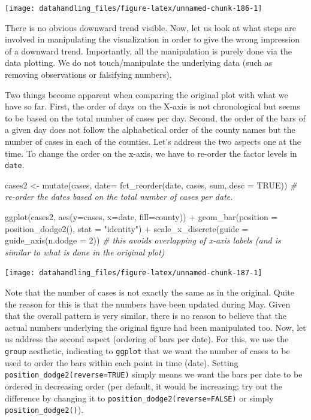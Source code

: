 \documentclass[
  12pt,
]{style/krantz}
\newenvironment{Shaded}{\begin{snugshade}}{\end{snugshade}}
\newcommand{\AttributeTok}[1]{\textcolor[rgb]{0.77,0.63,0.00}{#1}}
\newcommand{\CommentTok}[1]{\textcolor[rgb]{0.56,0.35,0.01}{\textit{#1}}}
\newcommand{\ConstantTok}[1]{\textcolor[rgb]{0.00,0.00,0.00}{#1}}
\newcommand{\DecValTok}[1]{\textcolor[rgb]{0.00,0.00,0.81}{#1}}
\newcommand{\FunctionTok}[1]{\textcolor[rgb]{0.00,0.00,0.00}{#1}}
\newcommand{\NormalTok}[1]{#1}
\newcommand{\OtherTok}[1]{\textcolor[rgb]{0.56,0.35,0.01}{#1}}
\newcommand{\SpecialCharTok}[1]{\textcolor[rgb]{0.00,0.00,0.00}{#1}}
\newcommand{\StringTok}[1]{\textcolor[rgb]{0.31,0.60,0.02}{#1}}
\begin{document}
\texttt{[image: datahandling\_files/figure-latex/unnamed-chunk-186-1]}

There is no obvious downward trend visible. Now, let us look at what steps are involved in manipulating the visualization in order to give the wrong impression of a downward trend. Importantly, all the manipulation is purely done via the data plotting. We do not touch/manipulate the underlying data (such as removing observations or falsifying numbers).

Two things become apparent when comparing the original plot with what we have so far. First, the order of days on the X-axis is not chronological but seems to be based on the total number of cases per day. Second, the order of the bars of a given day does not follow the alphabetical order of the county names but the number of cases in each of the counties. Let's address the two aspects one at the time. To change the order on the x-axis, we have to re-order the factor levels in \texttt{date}.

\begin{Shaded}
\begin{Highlighting}[]
\NormalTok{cases2 }\OtherTok{\textless{}{-}} \FunctionTok{mutate}\NormalTok{(cases, }\AttributeTok{date=} \FunctionTok{fct\_reorder}\NormalTok{(date, cases, sum,}\AttributeTok{.desc =} \ConstantTok{TRUE}\NormalTok{)) }\CommentTok{\# re{-}order the dates based on the total number of cases per date.}

\FunctionTok{ggplot}\NormalTok{(cases2, }\FunctionTok{aes}\NormalTok{(}\AttributeTok{y=}\NormalTok{cases, }\AttributeTok{x=}\NormalTok{date, }\AttributeTok{fill=}\NormalTok{county)) }\SpecialCharTok{+}
  \FunctionTok{geom\_bar}\NormalTok{(}\AttributeTok{position =} \FunctionTok{position\_dodge2}\NormalTok{(), }\AttributeTok{stat =} \StringTok{"identity"}\NormalTok{) }\SpecialCharTok{+}
  \FunctionTok{scale\_x\_discrete}\NormalTok{(}\AttributeTok{guide =} \FunctionTok{guide\_axis}\NormalTok{(}\AttributeTok{n.dodge =} \DecValTok{2}\NormalTok{))  }\CommentTok{\# this avoids overlapping of x{-}axis labels (and is similar to what is done in the original plot)}
\end{Highlighting}
\end{Shaded}

\texttt{[image: datahandling\_files/figure-latex/unnamed-chunk-187-1]}

Note that the number of cases is not exactly the same as in the original. Quite the reason for this is that the numbers have been updated during May. Given that the overall pattern is very similar, there is no reason to believe that the actual numbers underlying the original figure had been manipulated too. Now, let us address the second aspect (ordering of bars per date). For this, we use the \texttt{group} aesthetic, indicating to \texttt{ggplot} that we want the number of cases to be used to order the bars within each point in time (date). Setting \texttt{position\_dodge2(reverse=TRUE)} simply means we want the bars per date to be ordered in decreasing order (per default, it would be increasing; try out the difference by changing it to \texttt{position\_dodge2(reverse=FALSE)} or simply \texttt{position\_dodge2()}).
\end{document}
